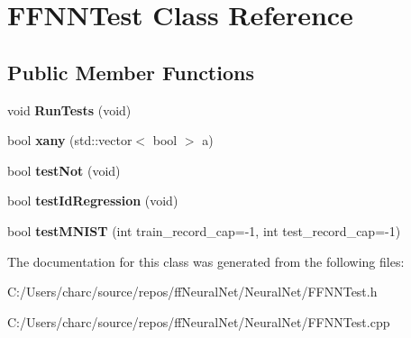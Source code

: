 \hypertarget{class_f_f_n_n_test}{}\section{F\+F\+N\+N\+Test Class Reference}
\label{class_f_f_n_n_test}
\subsection*{Public Member Functions}
\begin{DoxyCompactItemize}
\item 
\mbox{\label{class_f_f_n_n_test_a098a5e288baa36728d016d655dd8a13b}} 
void {\bfseries Run\+Tests} (void)
\item 
\mbox{\label{class_f_f_n_n_test_a8d7a4ff5daf1abe41d8aa3263dac1073}} 
bool {\bfseries xany} (std\+::vector$<$ bool $>$ a)
\item 
\mbox{\label{class_f_f_n_n_test_a83c05957353b5bb0d9204c110234a9ef}} 
bool {\bfseries test\+Not} (void)
\item 
\mbox{\label{class_f_f_n_n_test_a65f08161ecda5b43099837bf04885fbd}} 
bool {\bfseries test\+Id\+Regression} (void)
\item 
\mbox{\label{class_f_f_n_n_test_a0cc662c87158796a4114a01aa3badee9}} 
bool {\bfseries test\+M\+N\+I\+ST} (int train\+\_\+record\+\_\+cap=-\/1, int test\+\_\+record\+\_\+cap=-\/1)
\end{DoxyCompactItemize}


The documentation for this class was generated from the following files\+:\begin{DoxyCompactItemize}
\item 
C\+:/\+Users/charc/source/repos/ff\+Neural\+Net/\+Neural\+Net/F\+F\+N\+N\+Test.\+h\item 
C\+:/\+Users/charc/source/repos/ff\+Neural\+Net/\+Neural\+Net/F\+F\+N\+N\+Test.\+cpp\end{DoxyCompactItemize}
